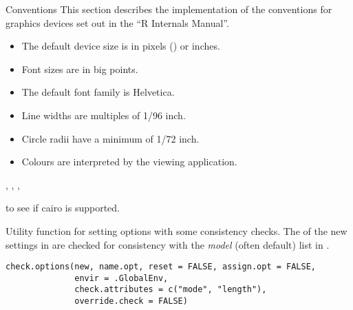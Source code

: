 \begin{Section}{Conventions}
This section describes the implementation of the conventions for
graphics devices set out in the ``R Internals Manual''.

\begin{itemize}

\item The default device size is in pixels () or inches.
\item Font sizes are in big points.
\item The default font family is Helvetica.
\item Line widths are multiples of 1/96 inch.
\item Circle radii have a minimum of 1/72 inch.
\item Colours are interpreted by the viewing application.

\end{itemize}

\end{Section}
%
\begin{SeeAlso}\relax
{}, , ,

 to see if cairo is supported.
\end{SeeAlso}
%
\begin{Description}\relax
Utility function for setting options with some consistency checks.
The  of the new settings in  are
checked for consistency with the \emph{model} (often default)
list in .
\end{Description}
%
\begin{Usage}
\begin{verbatim}
check.options(new, name.opt, reset = FALSE, assign.opt = FALSE,
              envir = .GlobalEnv,
              check.attributes = c("mode", "length"),
              override.check = FALSE)
\end{verbatim}
\end{Usage}
%
